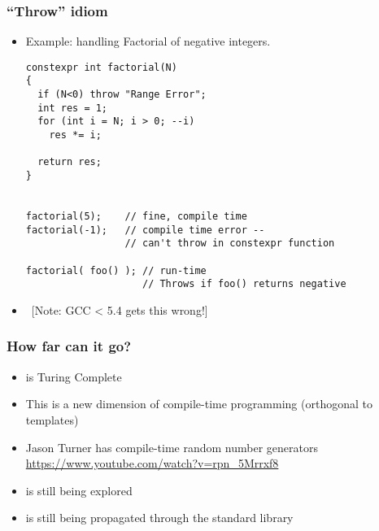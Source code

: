 \begin{frame}[fragile,t]
\frametitle{``Throw'' idiom}
\begin{itemize}[<+->]
\item Example: handling Factorial of negative integers.
{\scriptsize\begin{verbatim}
constexpr int factorial(N)
{
  if (N<0) throw "Range Error";
  int res = 1;
  for (int i = N; i > 0; --i)
    res *= i;

  return res;
}


factorial(5);    // fine, compile time
factorial(-1);   // compile time error -- 
                 // can't throw in constexpr function

factorial( foo() ); // run-time
                    // Throws if foo() returns negative
\end{verbatim}
}

\item \ [Note: GCC < 5.4 gets this wrong!]

\end{itemize}
\end{frame}


\begin{frame}[fragile,t]
\frametitle{How far can it go?}
\begin{itemize}[<+->]
\item \cexpr is Turing Complete
\item This is a new dimension of compile-time programming (orthogonal
  to templates)
\item Jason Turner has compile-time random number generators \Emph{(!)}
\url{https://www.youtube.com/watch?v=rpn_5Mrrxf8}
\item \cexpr is still being explored
\item \cexpr is still being propagated through the standard library
\end{itemize}
\end{frame}



